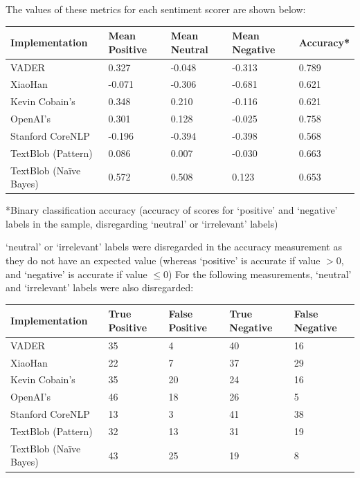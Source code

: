 \documentclass{report}
\begin{document}
The values of these metrics for each sentiment scorer are shown below: 

\vspace{0.5em}
\noindent
\begin{tabu} to 1.0\textwidth { | X[c] | X[c] | X[c] | X[c] | X[c] | }
	\hline
	Implementation & Mean Positive & Mean Neutral & Mean Negative & Accuracy* \\
	\hline
	VADER \cite{VADER} & 0.327 & -0.048 & -0.313 & 0.789 \\
	\hline
	XiaoHan \cite{kalchbrennerACL2014} & -0.071 & -0.306 & -0.681 & 0.621 \\
	\hline
	Kevin Cobain's \cite{kevincobain} & 0.348 & 0.210 & -0.116 & 0.621 \\
	\hline
	OpenAI's \cite{OpenAI} & 0.301 & 0.128 & -0.025 & 0.758 \\
	\hline
	Stanford CoreNLP \cite{StanfordNLP} & -0.196 & -0.394 & -0.398 & 0.568 \\
	\hline
	TextBlob \cite{textblob} (Pattern) & 0.086 & 0.007 & -0.030 & 0.663 \\
	\hline
	TextBlob \cite{textblob} (Na\"{i}ve Bayes) & 0.572 & 0.508 & 0.123 & 0.653 \\
	\hline
\end{tabu}

\vspace{0.2em}
*Binary classification accuracy (accuracy of scores for `positive' and `negative' labels in the sample, disregarding `neutral' or `irrelevant' labels)

`neutral' or `irrelevant' labels were disregarded in the accuracy measurement as they do not have an expected value (whereas `positive' is accurate if value $>$0, and `negative' is accurate if value $\le$0)
For the following measurements, `neutral' and `irrelevant' labels were also disregarded:

\vspace{0.5em}
\noindent
\begin{tabu} to 1.0\textwidth { | X[c] | X[c] | X[c] | X[c] | X[c] |}
	\hline
	Implementation & True Positive & False Positive & True Negative & False Negative \\
	\hline
	VADER \cite{VADER} & 35 & 4 & 40 & 16 \\
	\hline
	XiaoHan \cite{kalchbrennerACL2014} & 22 & 7 & 37 & 29 \\
	\hline
	Kevin Cobain's \cite{kevincobain} & 35 & 20 & 24 & 16 \\
	\hline
	OpenAI's \cite{OpenAI} & 46 & 18 & 26 & 5 \\
	\hline
	Stanford CoreNLP \cite{StanfordNLP} & 13 & 3 & 41 & 38 \\
	\hline
	TextBlob \cite{textblob} (Pattern) & 32 & 13 & 31 & 19 \\
	\hline
	TextBlob \cite{textblob} (Na\"{i}ve Bayes) & 43 & 25 & 19 & 8 \\
	\hline
\end{tabu}
\vspace{0.5em}
	
\end{document}
